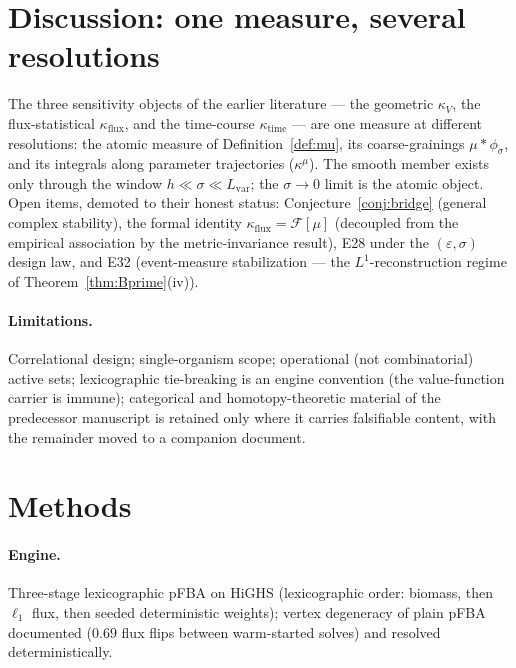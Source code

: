 \documentclass[11pt,a4paper]{article}
\theoremstyle{plain}
\theoremstyle{definition}
\theoremstyle{remark}
\newcommand{\kk}{\kappa_{\!V}}
\newcommand{\kmu}{\kappa^{\mu}}
\begin{document}
\section{Discussion: one measure, several resolutions}
\label{sec:discussion}

The three sensitivity objects of the earlier literature --- the geometric
$\kk$, the flux-statistical $\kappa_{\mathrm{flux}}$, and the time-course
$\kappa_{\mathrm{time}}$ --- are one measure at different resolutions: the
atomic measure of Definition~\ref{def:mu}, its coarse-grainings
$\mu * \phi_\sigma$, and its integrals along parameter trajectories
($\kmu$). The smooth member exists only through the window
$h \ll \sigma \ll L_{\mathrm{var}}$; the $\sigma \to 0$ limit is the
atomic object. Open items, demoted to their honest status:
Conjecture~\ref{conj:bridge} (general complex stability), the formal
identity $\kappa_{\mathrm{flux}} = \mathcal{F}[\mu]$ (decoupled from the
empirical association by the metric-invariance result), E28 under the
$(\varepsilon, \sigma)$ design law, and E32 (event-measure stabilization
--- the $L^1$-reconstruction regime of Theorem~\ref{thm:Bprime}(iv)).

\paragraph{Limitations.}
Correlational design; single-organism scope; operational (not
combinatorial) active sets; lexicographic tie-breaking is an engine
convention (the value-function carrier is immune); categorical and
homotopy-theoretic material of the predecessor manuscript is retained only
where it carries falsifiable content, with the remainder moved to a
companion document.

\section{Methods}\label{sec:methods}

\paragraph{Engine.} Three-stage lexicographic pFBA on HiGHS (lexicographic
order: biomass, then $\ell_1$ flux, then seeded deterministic weights);
vertex degeneracy of plain pFBA documented ($0.69$ flux flips between
warm-started solves) and resolved deterministically.
\end{document}
